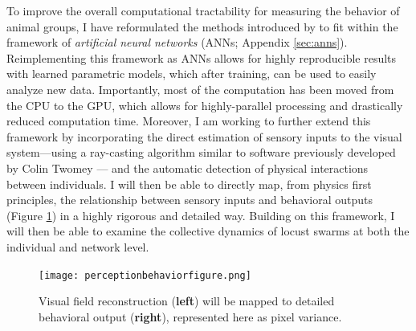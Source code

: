 \documentclass[11pt,a4paper,oneside]{article}
\begin{document}
	\par
	To improve the overall computational tractability for measuring the behavior of animal groups, I have reformulated the methods introduced by \citet{berman2014mapping,berman2014drosopholid} to fit within the framework of \textit{artificial neural networks} (ANNs; Appendix \ref{sec:anns}). Reimplementing this framework as ANNs allows for highly reproducible results with learned parametric models, which after training, can be used to easily analyze new data. Importantly, most of the computation has been moved from the CPU to the GPU, which allows for highly-parallel processing and drastically reduced computation time. Moreover, I am working to further extend this framework by incorporating the direct estimation of sensory inputs to the visual system---using a ray-casting algorithm similar to software previously developed by Colin Twomey \citep{strandburg2013visual,rosenthal2015network,twomey2016vision}--- and the automatic detection of physical interactions between individuals. I will then be able to directly map, from physics first principles, the relationship between sensory inputs and behavioral outputs (Figure \ref{fig:perceptionbehavior}) in a highly rigorous and detailed way. Building on this framework, I will then be able to examine the collective dynamics of locust swarms at both the individual and network level. 
	
	\begin{figure}
		\begin{center}
			\texttt{[image: perceptionbehaviorfigure.png]}\\
		\end{center}
		\begin{flushleft}
			\caption{Visual field reconstruction (\textbf{left}) will be mapped to detailed behavioral output (\textbf{right}), represented here as pixel variance.\label{fig:perceptionbehavior}} 
		\end{flushleft}
	\end{figure} 
	
\end{document}
